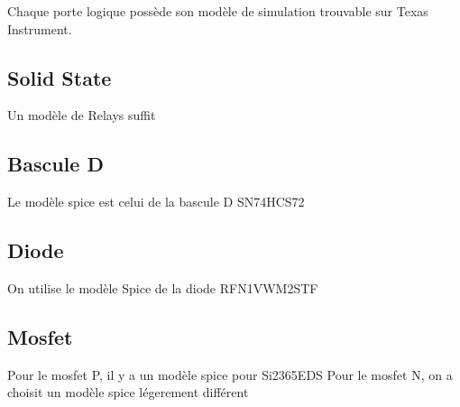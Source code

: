\documentclass{EPSA-rap-template}
\begin{document}
Chaque porte logique possède son modèle de simulation trouvable sur Texas Instrument.

\subsection{Solid State}

Un modèle de Relays suffit

\subsection{Bascule D}

Le modèle spice est celui de la bascule D SN74HCS72

\subsection{Diode}

On utilise le modèle Spice de la diode RFN1VWM2STF

\subsection{Mosfet}

Pour le mosfet P, il y a un modèle spice pour Si2365EDS
Pour le mosfet N, on a choisit un modèle spice légerement différent
\end{document}
